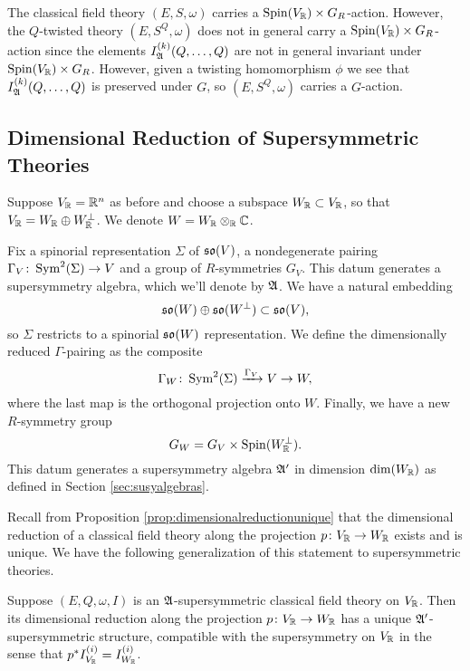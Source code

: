 \documentclass[10pt, oneside]{article}
\begin{document}
The classical field theory $(E, S, \omega)$ carries a $\mathrm{Spin}(V_\mathbb R)\times G_R$-action. However, the $Q$-twisted theory $(E, S^Q, \omega)$ does not in general carry a $\mathrm{Spin}(V_\mathbb R)\times G_R$-action since the elements $I_{\mathfrak A}^{(k)}(Q, \dots, Q)$ are not in general invariant under $\mathrm{Spin}(V_\mathbb R)\times G_R$. However, given a twisting homomorphism $\phi$ we see that $I_{\mathfrak A}^{(k)}(Q, \dots, Q)$ is preserved under $G$, so $(E, S^Q, \omega)$ carries a $G$-action.

\subsection{Dimensional Reduction of Supersymmetric Theories}

Suppose $V_\mathbb R=\mathbb R^n$ as before and choose a subspace $W_\mathbb R\subset V_\mathbb R$, so that $V_\mathbb R = W_\mathbb R\oplus W^\perp_\mathbb R$. We denote $W=W_{\mathbb R}\otimes_{\mathbb R} \mathbb C$.

Fix a spinorial representation $\Sigma$ of $\mathfrak{so}(V)$, a nondegenerate pairing $\Gamma_V\colon \operatorname{Sym}^2(\Sigma)\rightarrow V$ and a group of $R$-symmetries $G_V$.  This datum generates a supersymmetry algebra, which we'll denote by $\mathfrak{A}$.  We have a natural embedding
\[\mathfrak{so}(W)\oplus \mathfrak{so}(W^{\perp})\subset \mathfrak{so}(V),\]
so $\Sigma$ restricts to a spinorial $\mathfrak{so}(W)$ representation. We define the dimensionally reduced $\Gamma$-pairing as the composite
\[\Gamma_W\colon \operatorname{Sym}^2(\Sigma)\xrightarrow{\Gamma_V} V\rightarrow W,\]
where the last map is the orthogonal projection onto $W$. Finally, we have a new $R$-symmetry group
\[G_W = G_V\times \mathrm{Spin}(W^\perp_\mathbb R).\]
This datum generates a supersymmetry algebra $\mathfrak{A}'$ in dimension $\mathrm{dim}(W_\mathbb R)$ as defined in Section \ref{sec:susyalgebras}.

Recall from Proposition \ref{prop:dimensionalreductionunique} that the dimensional reduction of a classical field theory along the projection $p\colon V_\mathbb R\rightarrow W_\mathbb R$ exists and is unique. We have the following generalization of this statement to supersymmetric theories.

\begin{prop} \label{prop:susydimlred}
Suppose $(E, Q, \omega, I)$ is an $\mathfrak{A}$-supersymmetric classical field theory on $V_\mathbb R$. Then its dimensional reduction along the projection $p\colon V_\mathbb R\rightarrow W_\mathbb R$ has a unique $\mathfrak{A}'$-supersymmetric structure, compatible with the supersymmetry on $V_\mathbb R$ in the sense that $p^*I^{(i)}_{V_\mathbb R} = I^{(i)}_{W_\mathbb R}$.
\end{prop}
\end{document}
